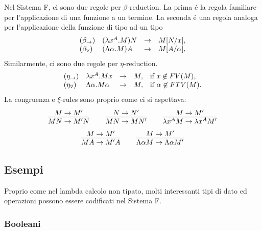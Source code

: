 \documentclass{article}
\begin{document}
Nel Sistema F, ci sono due regole per $\beta$-reduction.  La prima \'e la 
regola familiare per l'applicazione di una funzione a un termine. La seconda
\'e una regola analoga per l'applicazione della funzione di tipo ad un tipo
\[ \begin{array}{lllll}
(\beta_{\to}) & (\lambda x^{A}.M)N & \to & M[N/x], \\
(\beta_{\forall}) & (\Lambda\alpha.M)A & \to & M[A/\alpha],
\end{array}
\]
Similarmente, ci sono due regole per $\eta$-reduction.
\[ \begin{array}{lllll}
(\eta_{\to}) & \lambda x^{A}.Mx & \to & M, & \mbox{if $x\not\in FV(M)$,} \\
(\eta_{\forall}) & \Lambda\alpha.M\alpha & \to & M, & \mbox{if $\alpha\not\in FTV(M)$.}
\end{array}
\]
La congruenza e $\xi$-rules sono proprio come ci si aspettava:
\[ \deriv{M\to M'}{MN\to M'N}
\sep
\deriv{N\to N'}{MN\to MN'}
\sep
\deriv{M\to M'}{\lamabs{x}{A}{M}\to\lamabs{x}{A}{M'}}
\]
\[ \deriv{M\to M'}{MA\to M'A}
\sep
\deriv{M\to M'}{\Lamabs{\alpha}{M}\to\Lamabs{\alpha}{M'}}
\]

\subsection{Esempi}

Proprio come nel lambda calcolo non tipato, molti interessanti tipi di dato
ed operazioni possono essere codificati nel Sistema F. 

\subsubsection{Booleani}
\end{document}

